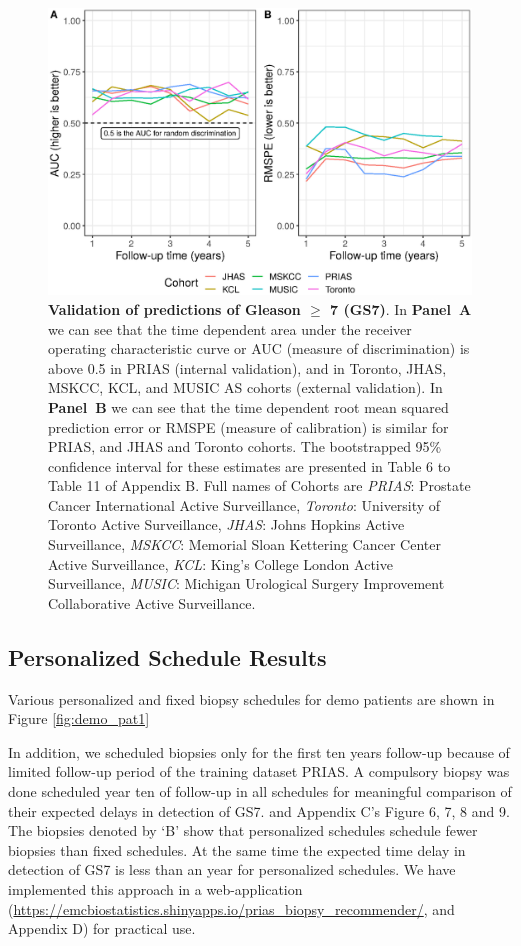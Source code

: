 \begin{figure}
\centerline{\includegraphics[width=\columnwidth]{images/auc_pe.eps}}
\caption{\textbf{Validation of predictions of Gleason $\geq$ 7 (GS7)}. In \textbf{Panel~A} we can see that the time dependent area under the receiver operating characteristic curve or AUC (measure of discrimination) is above 0.5 in PRIAS (internal validation), and in Toronto, JHAS, MSKCC, KCL, and MUSIC AS cohorts (external validation). In \textbf{Panel~B} we can see that the time dependent root mean squared prediction error or RMSPE (measure of calibration) is similar for PRIAS, and JHAS and Toronto cohorts. The bootstrapped 95\% confidence interval for these estimates are presented in Table 6 to Table 11 of Appendix B. Full names of Cohorts are \textit{PRIAS}: Prostate Cancer International Active Surveillance, \textit{Toronto}: University of Toronto Active Surveillance, \textit{JHAS}: Johns Hopkins Active Surveillance, \textit{MSKCC}: Memorial Sloan Kettering Cancer Center Active Surveillance, \textit{KCL}: King's College London Active Surveillance, \textit{MUSIC}: Michigan Urological Surgery Improvement Collaborative Active Surveillance.}
\label{fig:auc_calib}
\end{figure}

\subsection{Personalized Schedule Results}
Various personalized and fixed biopsy schedules for demo patients are shown in Figure \ref{fig:demo_pat1} 

In addition, we scheduled biopsies only for the first ten years follow-up because of limited follow-up period of the training dataset PRIAS. A compulsory biopsy was done scheduled year ten of follow-up in all schedules for meaningful comparison of their expected delays in detection of GS7. and Appendix C's Figure 6, 7, 8 and 9. The biopsies denoted by `B' show that personalized schedules schedule fewer biopsies than fixed schedules. At the same time the expected time delay in detection of GS7 is less than an year for personalized schedules. We have implemented this approach in a web-application (\url{https://emcbiostatistics.shinyapps.io/prias_biopsy_recommender/}, and Appendix D) for practical use.